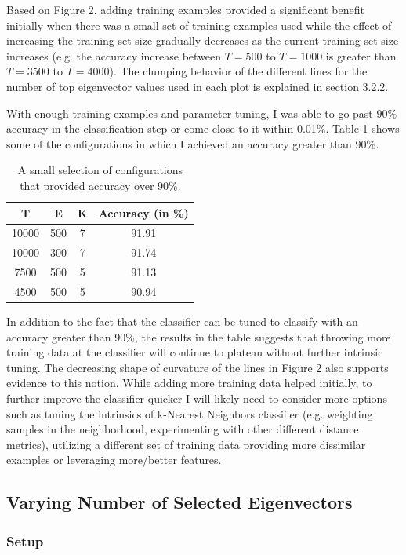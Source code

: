 \documentclass{article} %
\begin{document}
Based on Figure 2, adding training examples provided a significant benefit initially when there was a small set of training examples used while the effect of increasing the training set size gradually decreases as the current training set size increases (e.g. the accuracy increase between \(T=500\) to \(T=1000\) is greater than \(T=3500\) to \(T=4000\)). The clumping behavior of the different lines for the number of top eigenvector values used in each plot is explained in section 3.2.2.

With enough training examples and parameter tuning, I was able to go past 90\% accuracy in the classification step or come close to it within 0.01\%. Table 1 shows some of the configurations in which I achieved an accuracy greater than 90\%. 

\begin{table}[H]
\centering
\begin{tabular}{c|c|c|c}
T & E & K & Accuracy (in \%) \\\hline
10000 & 500 & 7 & 91.91 \\
10000 & 300 & 7 & 91.74 \\
7500 & 500 & 5 & 91.13 \\
4500 & 500 & 5 & 90.94 \\
\end{tabular}
\caption{\label{tab:widgets} A small selection of configurations that provided accuracy over 90\%.}
\end{table}

In addition to the fact that the classifier can be tuned to classify with an accuracy greater than 90\%, the results in the table suggests that throwing more training data at the classifier will continue to plateau without further intrinsic tuning. The decreasing shape of curvature of the lines in Figure 2 also supports evidence to this notion. While adding more training data helped initially, to further improve the classifier quicker I will likely need to consider more options such as tuning the intrinsics of k-Nearest Neighbors classifier (e.g. weighting samples in the neighborhood, experimenting with other different distance metrics), utilizing a different set of training data providing more dissimilar examples or leveraging more/better features.

\subsection{Varying Number of Selected Eigenvectors}

\subsubsection{Setup}
\end{document}

